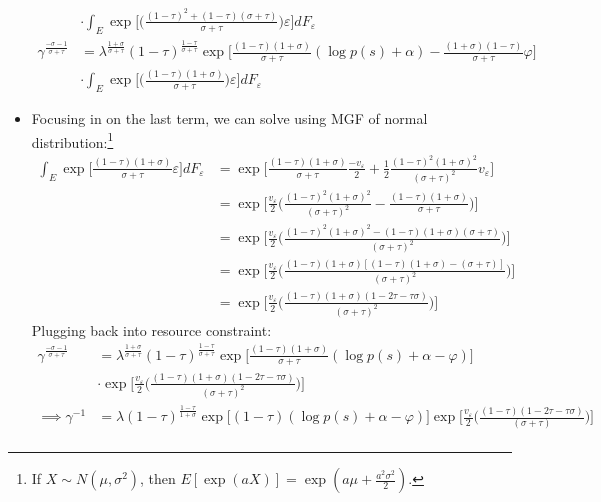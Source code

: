 \documentclass{article}
\begin{document}
\begin{itemize}
\begin{align*}
&\cdot \int_E  \exp  \Bigg[\Bigg(\frac{(1-\tau)^2 + (1 -\tau)(\sigma+\tau)}{\sigma+\tau} \Bigg) \varepsilon  \Bigg] dF_\varepsilon\\
\gamma^{\frac{-\sigma -1 }{\sigma+\tau}}
&= \lambda^{\frac{1+\sigma}{\sigma +\tau}}  (1-\tau)^{\frac{1 - \tau}{\sigma+\tau}}  \exp \Bigg[\frac{(1-\tau)(1+\sigma)}{\sigma +\tau}(\log p(s)+ \alpha)-\frac{(1+\sigma)(1-\tau)}{\sigma+\tau} \varphi \Bigg]\\
&\cdot \int_E  \exp  \Bigg[\Bigg(\frac{(1-\tau)(1+\sigma)}{\sigma+\tau} \Bigg) \varepsilon  \Bigg] dF_\varepsilon
\end{align*}
\item Focusing in on the last term, we can solve using MGF of normal distribution:\footnote{If $X \sim N(\mu, \sigma^2)$, then $E[\exp(aX)] = \exp(a\mu + \frac{a^2\sigma^2}{2})$.}
\begin{align*}
\int_E  \exp  \Bigg[\frac{(1-\tau)(1+\sigma)}{\sigma+\tau}  \varepsilon  \Bigg] dF_\varepsilon
&= \exp  \Bigg[ \frac{(1-\tau)(1+\sigma)}{\sigma+\tau}\frac{-v_\varepsilon}{2} +   \frac{1}{2}\frac{(1-\tau)^2(1+\sigma)^2}{(\sigma+\tau)^2} v_\varepsilon \Bigg]\\
&= \exp  \Bigg[\frac{v_\varepsilon}{2}\Bigg( \frac{(1-\tau)^2(1+\sigma)^2}{(\sigma+\tau)^2} - \frac{(1-\tau)(1+\sigma)}{\sigma+\tau}\Bigg) \Bigg]\\
&= \exp  \Bigg[\frac{v_\varepsilon}{2}\Bigg( \frac{(1-\tau)^2(1+\sigma)^2 - (1-\tau)(1+\sigma)(\sigma+\tau)}{(\sigma+\tau)^2}\Bigg) \Bigg]\\
&= \exp  \Bigg[\frac{v_\varepsilon}{2}\Bigg( \frac{(1-\tau)(1+\sigma)[(1-\tau)(1+\sigma) - (\sigma+\tau)]}{(\sigma+\tau)^2}\Bigg) \Bigg]\\
&= \exp  \Bigg[\frac{v_\varepsilon}{2}\Bigg( \frac{(1-\tau)(1+\sigma)(1-2\tau-\tau\sigma)}{(\sigma+\tau)^2}\Bigg) \Bigg]
\end{align*}
Plugging back into resource constraint:
\begin{align*}
\gamma^{\frac{-\sigma -1 }{\sigma+\tau}}
&= \lambda^{\frac{1+\sigma}{\sigma +\tau}}  (1-\tau)^{\frac{1 - \tau}{\sigma+\tau}}  \exp \Bigg[\frac{(1-\tau)(1+\sigma)}{\sigma +\tau}(\log p(s)+ \alpha - \varphi) \Bigg]\\
&\cdot \exp  \Bigg[\frac{v_\varepsilon}{2}\Bigg( \frac{(1-\tau)(1+\sigma)(1-2\tau-\tau\sigma)}{(\sigma+\tau)^2}\Bigg) \Bigg]\\
\implies
\gamma^{-1}
&= \lambda (1-\tau)^{\frac{1 - \tau}{1+\sigma}}  \exp \Bigg[(1-\tau)(\log p(s)+ \alpha -\varphi) \Bigg] \exp  \Bigg[\frac{v_\varepsilon}{2}\Bigg( \frac{(1-\tau)(1-2\tau-\tau\sigma)}{(\sigma+\tau)}\Bigg) \Bigg]\\

\end{align*}
\end{itemize}
\end{document}
